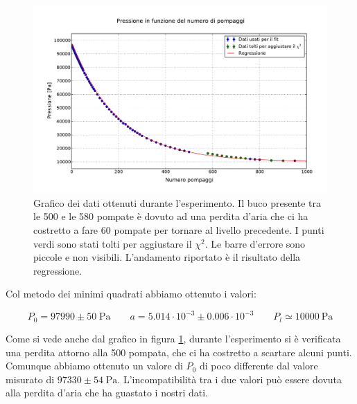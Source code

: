 \begin{figure}[t]
    \includegraphics[width=160mm]{graph.pdf}
    \caption{Grafico dei dati ottenuti durante l'esperimento. Il buco presente tra le 500 e le 580 pompate è dovuto ad una perdita d'aria
    che ci ha costretto a fare 60 pompate per tornare al livello precedente. I punti verdi sono stati tolti per aggiustare il $\chi^2$.
    Le barre d'errore sono piccole e non visibili. L'andamento riportato è il risultato della regressione.}
    \label{fig:graph1}
\end{figure}

Col metodo dei minimi quadrati abbiamo ottenuto i valori:

\begin{equation}
    P_0 = 97990 \pm 50 \; \si{\pascal} \qquad a = 5.014 \cdot 10^{-3} \pm 0.006 \cdot 10^{-3} \qquad P_l \simeq \SI{10000}{\pascal}
\end{equation}

Come si vede anche dal grafico in figura \ref{fig:graph1},
durante l'esperimento si è verificata una perdita attorno alla 500 pompata, che ci ha costretto a scartare alcuni punti.
Comunque abbiamo ottenuto un valore di $P_0$ di poco differente dal valore misurato di $97330 \pm 54 \; \si{\pascal}$.
L'incompatibilità tra i due valori può essere dovuta alla perdita d'aria che ha guastato i nostri dati.



